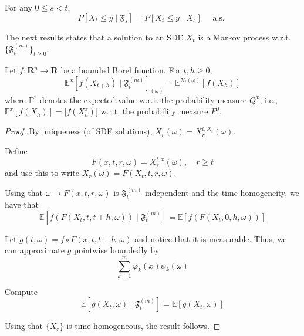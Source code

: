 \begin{definition}
    For any $0 \leq s < t$,
    \[
        P[X_t \leq y \mid \mathfrak{F}_s] = P[X_t \leq y \mid X_s] \quad \text{ a.s. }
    \]
\end{definition}

The next results states that a solution to an SDE $X_t$ is a Markov process w.r.t. $\{ \mathfrak{F}_t^{(m)} \}_{t \geq 0}$. 

\begin{theorem}\label{thm:markov_prop_ito}
    Let $f : \textbf{R}^n \longrightarrow \textbf{R}$ be a bounded Borel function. For $t, h \geq 0$, 
    \begin{equation}\label{eq:markov_property}
        \mathbb{E}^x [f(X_{t+h}) \mid \mathfrak{F}_t^{(m)}]_{(\omega)} = \mathbb{E}^{X_t(\omega)} [f(X_h)]
    \end{equation}
    where $\mathbb{E}^x$ denotes the expected value w.r.t. the probability measure $Q^x$, i.e., $\mathbb{E}^x[f(X_h)] = \mathbb[f(X_h^x)]$ w.r.t. the probability measure $P^0$. 
\end{theorem}

\begin{proof}
    By uniqueness (of SDE solutions), $X_r(\omega) = X_r^{t, X_t}(\omega)$. 

    Define 
    \[
        F(x, t, r, \omega) = X_r^{t,x}(\omega), \quad r \geq t
    \]
    and use this to write $X_r(\omega) = F(X_t, t, r, \omega)$. 

    Using that $\omega \longrightarrow F(x, t, r, \omega)$ is $\mathfrak{F}_t^{(m)}$-independent and the time-homogeneity, we have that 
    \[
        \mathbb{E}[f(F(X_t, t, t+h, \omega)) \mid \mathfrak{F}_t^{(m)}] = \mathbb{E}[f(F(X_t, 0, h, \omega))]
    \]

    Let $g(t, \omega) = f \circ F(x, t, t+h, \omega)$ and notice that it is measurable. Thus, we can approximate $g$ pointwise boundedly by 
    \[
        \sum_{k=1}^{m} \varphi_k(x) \psi_k(\omega)
    \]

    Compute 
    \[
        \mathbb{E}[g(X_t, \omega) \mid \mathfrak{F}_t^{(m)}] = \mathbb{E}[g(X_t, \omega)]
    \]

    Using that $\{ X_r \}$ is time-homogeneous, the result follows. 
\end{proof}


